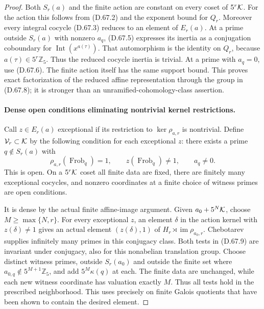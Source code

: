\begin{proof}
Both \(S_r(a)\) and the finite action are
constant on every coset of \(5^r{\cal K}\).
For the action this follows from (D.67.2) and
the exponent bound for \(Q_r\). Moreover every
integral cocycle (D.67.3) reduces to an element
of \(E_r(a)\). At a prime outside \(S_r(a)\)
with nonzero \(a_q\), (D.67.5) expresses its
inertia as a conjugation coboundary for
\(\operatorname{Int}(x^{a(\tau)})\). That
automorphism is the identity on \(Q_r\),
because \(a(\tau)\in5^r\mathbb Z_5\).
Thus the reduced cocycle inertia is trivial.
At a prime with \(a_q=0\), use (D.67.6).
The finite action itself has the same support
bound. This proves exact factorization of the
reduced affine representation through the
group in (D.67.8); it is stronger than an
unramified-cohomology-class assertion.

\paragraph{Dense open conditions eliminating nontrivial kernel restrictions.}
Call \(z\in E_r(a)\) exceptional if its
restriction to \(\ker\rho_{a,r}\) is nontrivial.
Define \({\cal V}_r\subset{\cal K}\) by the
following condition for each exceptional \(z\):
there exists a prime \(q\notin S_r(a)\) with
\[
 \rho_{a,r}(\operatorname{Frob}_q)=1,\qquad
 z(\operatorname{Frob}_q)\ne1,\qquad a_q\ne0.
                                                        \tag{D.67.9}
\]
This is open. On a \(5^r{\cal K}\) coset
all finite data are fixed, there are finitely
many exceptional cocycles, and nonzero
coordinates at a finite choice of witness
primes are open conditions.

It is dense by the actual finite affine-image
argument. Given \(a_0+5^N{\cal K}\), choose
\(M\ge\max\{N,r\}\). For every exceptional
\(z\), an element \(\delta\) in the action
kernel with \(z(\delta)\ne1\) gives an actual
element \((z(\delta),1)\) of
\(H_r\rtimes\operatorname{im}\rho_{a_0,r}\).
Chebotarev supplies infinitely many primes
in this conjugacy class. Both tests in
(D.67.9) are invariant under conjugacy, also
for this nonabelian translation group.
Choose distinct witness primes, outside
\(S_r(a_0)\) and outside the finite set where
\(a_{0,q}\notin5^{M+1}\mathbb Z_5\), and add
\(5^M\kappa(q)\) at each. The finite data
are unchanged, while each new witness
coordinate has valuation exactly \(M\).
Thus all tests hold in the prescribed
neighborhood. This uses precisely
\cite[Chapter V, Theorem 3.23]{PBC_MilneCFT}
on finite Galois quotients that have been
shown to contain the desired element.


\end{proof}
